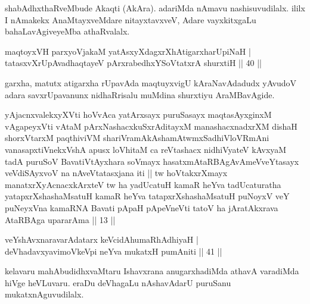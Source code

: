 \begin{artha}
shabAdhxthaRveMbude Akaqti (AkAra). adariMda nAmavu nashisuvudilalx. ililx I nAmakekx AnaMtayxveMdare nitayxtavxveV, Adare vayxkitxgaLu bahaLavAgiveyeMba athaRvalalx.
\end{artha}


\begin{shl}
maqtoyxVH parxyoVjakaM yatAsxyXdagxrXhAtigarxharUpiNaH |\\
tatasxvXrUpAvadhaqtayeV pArxrabedhxYSoVtatxrA shurxtiH \hfill || 40 ||
\end{shl}

\begin{artha}
garxha, matutx atigarxha rUpavAda maqtuyxvigU kAraNavAdadudx yAvudoV adara savxrUpavanunx nidhaRrisalu muMdina shurxtiyu AraMBavAgide.
\end{artha}


\begin{kandikeshl}
yAjacnxvalekxyXVti hoVvAca yatArxsayx puruSasayx maqtasAyxginxM vAgapeyxVti vAtaM pArxNashacxkuSxrAditayxM manashacxnadxrXM dishaH shorxVtarxM paqthiviVM shariVramAkAshamAtwmxSadhiVloVRmAni vanasapxtiVnekxVshA apusx loVhitaM ca reVtashacx nidhiVyateV kAvxyaM tadA puruSoV BavatiVtAyxhara soVmayx hasatxmAtaRBAgAvAmeVveYtasayx veVdiSAyxvoV na nAveVtatasxjana iti || tw hoVtakxrXmayx manatxrXyAcnacxkArxteV tw ha yadUcatuH kamaR heYva tadUcaturatha yatapxrXshashaMsatuH kamaR heYva tatapxrXshashaMsatuH puNoyxV veY puNeyxVna kamaRNA Bavati pApaH pApeVneVti tatoV ha jAratAkxrava AtaRBAga upararAma || 13 ||
\end{kandikeshl}



\begin{shl}
veYshAvxnaravarAdatarx keVcidAhumaRhAdhiyaH |\\
deVhadavxyavimoVkeV\s pi neYva mukatxH pumAniti \hfill || 41 ||
\end{shl}


\begin{artha}
kelavaru mahAbudidhxvaMtaru Ishavxrana anugarxhadiMda athavA varadiMda hiVge heVLuvaru. eraDu deVhagaLu nAshavAdarU puruSanu mukatxnAguvudilalx.
\end{artha}

